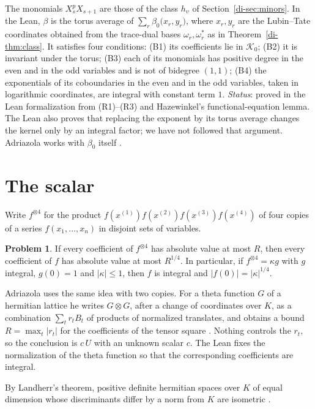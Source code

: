 \documentclass[reqno]{amsart}
\theoremstyle{definition}
\newtheorem{problem}{Problem}[section]
\theoremstyle{plain}
\theoremstyle{remark}
\newcommand{\Kc}{\mathcal K}
\begin{document}
The monomials \(X_s^pX_{s+1}\) are those of the class \(h_\upsilon\) of Section~\ref{di-sec:minors}.  In the Lean, \(\beta\) is the torus average of \(\sum_r\beta_0\big(x_r,y_r\big)\), where \(x_r,y_r\) are the Lubin--Tate coordinates obtained from the trace-dual bases \(\omega_r,\omega_r^*\) as in Theorem~\ref{di-thm:class}.  It satisfies four conditions: (B1) its coefficients lie in \(\Kc_0\); (B2) it is invariant under the torus; (B3) each of its monomials has positive degree in the even and in the odd variables and is not of bidegree \((1,1)\); (B4) the exponentials of its coboundaries in the even and in the odd variables, taken in logarithmic coordinates, are integral with constant term \(1\).  \emph{Status}: proved in the Lean formalization from (R1)--(R3) and Hazewinkel's functional-equation lemma.  The Lean also proves that replacing the exponent by its torus average changes the kernel only by an integral factor; we have not followed that argument.  Adriazola works with \(\beta_0\) itself \cite[Thm.~8.12]{Adr}.

\section{The scalar}\label{sec:scalar}
Write \(f^{\otimes4}\) for the product \(f(x^{(1)})f(x^{(2)})f(x^{(3)})f(x^{(4)})\) of four copies of a series \(f(x_1,\dots,x_n)\) in disjoint sets of variables.

\begin{problem}\label{pr:fourth}
If every coefficient of \(f^{\otimes4}\) has absolute value at most \(R\), then every coefficient of \(f\) has absolute value at most \(R^{1/4}\).  In particular, if \(f^{\otimes4}=\kappa g\) with \(g\) integral, \(g(0)=1\) and \(\lvert\kappa\rvert\le1\), then \(f\) is integral and \(\lvert f(0)\rvert=\lvert\kappa\rvert^{1/4}\).
\end{problem}

Adriazola uses the same idea with two copies.  For a theta function \(G\) of a hermitian lattice he writes \(G\otimes G\), after a change of coordinates over \(K\), as a combination \(\sum_tr_tB_t\) of products of normalized translates, and obtains a bound \(R=\max_t\lvert r_t\rvert\) for the coefficients of the tensor square \cite[Thm.~8.19]{Adr}.  Nothing controls the \(r_t\), so the conclusion is \(c\,U\) with an unknown scalar \(c\).  The Lean fixes the normalization of the theta function so that the corresponding coefficients are integral.

By Landherr's theorem, positive definite hermitian spaces over \(K\) of equal dimension whose discriminants differ by a norm from \(K\) are isometric \cite[Ch.~10, \S6]{Sch}.
\end{document}
